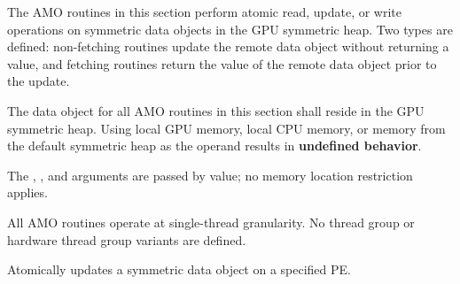 
The \ac{AMO} routines in this section perform atomic read, update, or write
operations on symmetric data objects in the \ac{GPU} symmetric heap. Two types
are defined: non-fetching routines update the remote data object without
returning a value, and fetching routines return the value of the remote data
object prior to the update.

The  data object for all \ac{AMO} routines in this section shall reside
in the \ac{GPU} symmetric heap. Using local \ac{GPU} memory, local CPU memory, or
memory from the default symmetric heap as the  operand results in
\textbf{undefined behavior}.

The , , and  arguments are passed by value;
no memory location restriction applies.

All \ac{AMO} routines operate at single-thread granularity. No thread group or
hardware thread group variants are defined.

\label{subsec:gc_nonfetch_amo}

Atomically updates a symmetric data object on a specified \ac{PE}.

